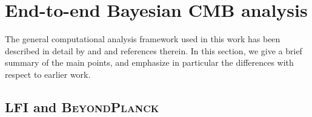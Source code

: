 \documentclass[twocolumn]{../../common/aa}
\def\WMAP{\emph{WMAP}}
\def\WMAPnine{\emph{WMAP9}}
\def\Planck{\emph{Planck}}
\def\commanderthree{\texttt{Commander3}}
\newcommand{\bp}{\textsc{BeyondPlanck}}
\newcommand{\cosmoglobe}{\textsc{Cosmoglobe}}
\begin{document}
%
%


\section{End-to-end Bayesian CMB analysis}
\label{sec:methods}

The general computational analysis framework used in this work has been described in detail by \citet{bp01} and \citet{bp17} and references therein. In this section, we give a brief summary of the main points, and emphasize in particular the differences with respect to earlier work. 

\subsection{LFI and \bp}
\label{sec:lfi_bp}
\end{document}

